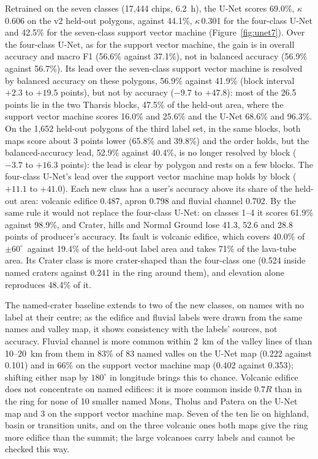 \documentclass[twocolumn]{aastex701}
\newcommand{\pmsixty}{$\pm60^{\circ}$}
\newcommand{\kap}{$\kappa$}
\begin{document}
Retrained on the seven classes (17,444 chips, 6.2~h), the U-Net scores 69.0\%, \kap\,0.606 on the v2 held-out
polygons, against 44.1\%, \kap\,0.301 for the four-class U-Net and 42.5\% for the seven-class support vector machine
(Figure~\ref{fig:unet7}). Over the four-class U-Net, as for the support vector machine, the gain is in overall accuracy
and macro F1 (56.6\% against 37.1\%), not in balanced accuracy (56.9\% against 56.7\%). Its lead over the seven-class
support vector machine is resolved by balanced accuracy on these polygons, 56.9\% against 41.9\% (block interval $+2.3$ to $+19.5$ points), but not by accuracy ($-9.7$ to $+47.8$): most of the 26.5 points lie
in the two Tharsis blocks, 47.5\% of the held-out area, where the support vector machine scores 16.0\% and 25.6\% and
the U-Net 68.6\% and 96.3\%. On the 1,652 held-out polygons of the third label set, in the same blocks, both maps score about 3 points
lower (65.8\% and 39.8\%) and the order holds, but the balanced-accuracy lead, 52.9\% against 40.4\%, is no longer
resolved by block ($-3.7$ to $+16.3$ points): the lead is clear by polygon and rests on a few blocks. %
The four-class U-Net's lead over the support vector machine map holds by block ($+11.1$ to $+41.0$).
Each new class has a user's accuracy above its share of the held-out area: volcanic %
edifice 0.487, apron 0.798 and fluvial channel 0.702. By the same rule it would not replace the four-class U-Net: on
classes 1--4 it scores 61.9\% against 98.9\%, and Crater, hills and Normal Ground lose 41.3, 52.6 and 28.8 points of
producer's accuracy. Its fault is volcanic edifice, which covers 40.0\% of \pmsixty\ against 19.4\% of the held-out
label area and takes 71\% of the lava-tube area. Its Crater class is more crater-shaped than the four-class one
(0.524 inside named craters against 0.241 in the ring around them), and elevation alone reproduces 48.4\% of it.

The named-crater baseline extends to two of the new classes, on names with no label at their centre; as the edifice
and fluvial labels were drawn from the same names and valley map, it shows consistency with the labels' sources, not
accuracy. Fluvial channel is more common within 2~km of the valley lines of \citet{Alemanno2018} than 10--20~km from
them in 83\% of 83 named valles on the U-Net map (0.222 against 0.101) and in 66\% on the support vector machine map
(0.402 against 0.353); shifting either map by $180^\circ$ in longitude brings this to chance. Volcanic edifice does
not concentrate on named edifices: it is more common inside $0.7R$ than in the ring for none of 10 smaller named
Mons, Tholus and Patera on the U-Net map and 3 on the support vector machine map. Seven of the ten lie on highland,
basin or transition units, and on the three volcanic ones both maps give the ring more edifice than the summit; the
large volcanoes carry labels and cannot be checked this way. %
\end{document}
